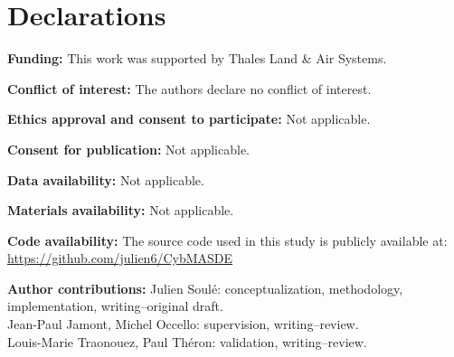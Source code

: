 \documentclass[pdflatex,sn-mathphys-num]{sn-jnl}%
\theoremstyle{thmstyleone}%
\theoremstyle{thmstyletwo}%
\theoremstyle{thmstylethree}%
\begin{document}
\section*{Declarations}
%
\begin{enumerate*}
    \item \textbf{Funding:} This work was supported by Thales Land \& Air Systems.
    \item \textbf{Conflict of interest:} The authors declare no conflict of interest.
    \item \textbf{Ethics approval and consent to participate:} Not applicable.
    \item \textbf{Consent for publication:} Not applicable.
    \item \textbf{Data availability:} Not applicable.
    \item \textbf{Materials availability:} Not applicable.
    \item \textbf{Code availability:} The source code used in this study is publicly available at: \url{https://github.com/julien6/CybMASDE}
    \item \textbf{Author contributions:} Julien Soulé: conceptualization, methodology, implementation, writing--original draft.\\
          Jean-Paul Jamont, Michel Occello: supervision, writing--review.\\
          Louis-Marie Traonouez, Paul Théron: validation, writing--review.
\end{enumerate*}

\setlength{\bibsep}{4.5pt}

\end{document}
